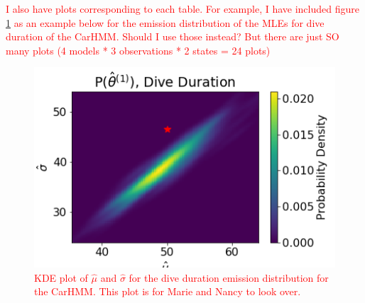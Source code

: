 \textcolor{red}{I also have plots corresponding to each table. For example, I have included figure \ref{fig:MLE_dist} as an example below for the emission distribution of the MLEs for dive duration of the CarHMM. Should I use those instead? But there are just SO many plots (4 models * 3 observations * 2 states = 24 plots)}

\begin{figure}[ht]
	\centering
	\includegraphics[width=5in]{../Plots/hmm_FV_MLE_density_dive_duration_-1.png}
	\caption{\textcolor{red}{KDE plot of $\hat \mu$ and $\hat \sigma$ for the dive duration emission distribution for the CarHMM. This plot is for Marie and Nancy to look over.}}
	\label{fig:MLE_dist}
\end{figure}


